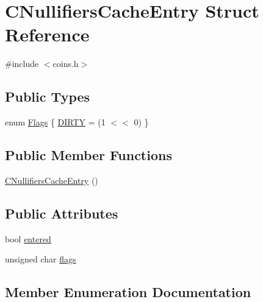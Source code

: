 \hypertarget{struct_c_nullifiers_cache_entry}{}\section{C\+Nullifiers\+Cache\+Entry Struct Reference}
\label{struct_c_nullifiers_cache_entry}


{\ttfamily \#include $<$coins.\+h$>$}

\subsection*{Public Types}
\begin{DoxyCompactItemize}
\item 
enum \mbox{\hyperlink{struct_c_nullifiers_cache_entry_abab8ccaf690113cc858e65bf06a0bb52}{Flags}} \{ \mbox{\hyperlink{struct_c_nullifiers_cache_entry_abab8ccaf690113cc858e65bf06a0bb52a8327a6b2ebe35e3324225d9bde0f8086}{D\+I\+R\+TY}} = (1 $<$$<$ 0)
 \}
\end{DoxyCompactItemize}
\subsection*{Public Member Functions}
\begin{DoxyCompactItemize}
\item 
\mbox{\hyperlink{struct_c_nullifiers_cache_entry_a9c20ec987581b8312e047a91c4d816e8}{C\+Nullifiers\+Cache\+Entry}} ()
\end{DoxyCompactItemize}
\subsection*{Public Attributes}
\begin{DoxyCompactItemize}
\item 
bool \mbox{\hyperlink{struct_c_nullifiers_cache_entry_a48e3ed309af746afff099ff009029376}{entered}}
\item 
unsigned char \mbox{\hyperlink{struct_c_nullifiers_cache_entry_a16a0caf56cd410c811b0e4ac50e4feb9}{flags}}
\end{DoxyCompactItemize}


\subsection{Member Enumeration Documentation}
\mbox{\label{struct_c_nullifiers_cache_entry_abab8ccaf690113cc858e65bf06a0bb52}} 
